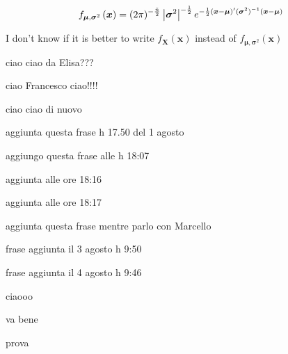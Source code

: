 \documentclass{article}
\begin{document}
\begin{equation*}
f_{\boldsymbol{\mu },\boldsymbol{\sigma }^{2}}\left( \boldsymbol{x}\right)
=(2\pi )^{-\frac{\bar{n}}{2}}\left\vert \boldsymbol{\sigma }^{2}\right\vert
^{-\frac{1}{2}}e^{-\frac{1}{2}\left( \boldsymbol{x}-\boldsymbol{\mu }\right)
^{\prime }(\boldsymbol{\sigma }^{2})^{-1}\left( \boldsymbol{x}-\boldsymbol{%
\mu }\right) }
\end{equation*}

I don't know if it is better to write $f_{\boldsymbol{X}}\left( \boldsymbol{x%
}\right) $ instead of $f_{\boldsymbol{\mu },\boldsymbol{\sigma }^{2}}\left( 
\boldsymbol{x}\right) $

\bigskip

ciao ciao da Elisa???

\bigskip

ciao Francesco ciao!!!!

\bigskip

ciao ciao di nuovo

aggiunta questa frase h 17.50 del 1 agosto

\bigskip

aggiungo questa frase alle h 18:07

\bigskip

aggiunta alle ore 18:16

\bigskip

aggiunta alle ore 18:17

\bigskip 

aggiunta questa frase mentre parlo con Marcello

frase aggiunta il 3 agosto h 9:50

\bigskip

frase aggiunta il 4 agosto h 9:46

ciaooo

va bene

prova
\end{document}
